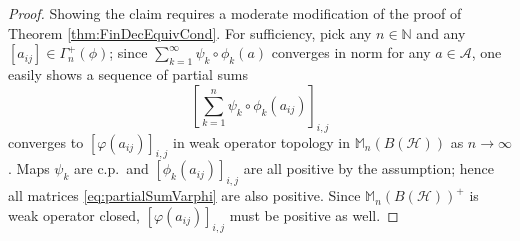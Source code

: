 \documentclass[reqno]{amsart}
\theoremstyle{plain}
\numberwithin{equation}{section}
\numberwithin{theorem}{section}
\numberwithin{lemma}{section}
\numberwithin{definition}{section}
\numberwithin{corollary}{section}
\numberwithin{remark}{section}
\newcommand{\naturals}{\mathbb{N}}
\newcommand{\hilbert}{\mathcal{H}}
\newcommand{\matra}[2]{\mathbb{M}_{#1}(#2)}
\begin{document}
\begin{proof}
    Showing the claim requires a moderate modification of the proof of Theorem \ref{thm:FinDecEquivCond}. For sufficiency, pick any $n\in\naturals$ and any $\left[a_{ij}\right] \in \Gamma_{n}^{+}(\phi)$; since $\sum_{k=1}^{\infty}\psi_k \circ \phi_k (a)$ converges in norm for any $a\in\mathscr{A}$, one easily shows a sequence of partial sums
    \begin{equation}\label{eq:partialSumVarphi}
        \left[\sum_{k=1}^{n}\psi_k\circ\phi_k(a_{ij})\right]_{i,j}
    \end{equation}
    converges to $\left[\varphi(a_{ij})\right]_{i,j}$ in weak operator topology in $\matra{n}{B(\hilbert)}$ as $n\to\infty$. Maps $\psi_k$ are c.p.~and $\left[\phi_k(a_{ij})\right]_{i,j}$ are all positive by the assumption; hence all matrices \eqref{eq:partialSumVarphi} are also positive. Since $\matra{n}{B(\hilbert)}^+$ is weak operator closed, $\left[\varphi(a_{ij})\right]_{i,j}$ must be positive as well.


\end{proof}
\end{document}
